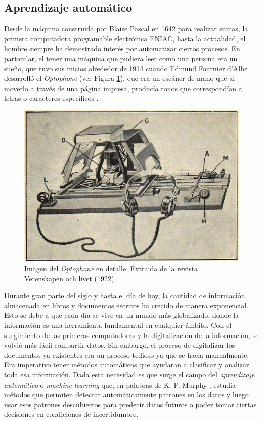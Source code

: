 \subsection{Aprendizaje automático}

	Desde la máquina construida por Blaise Pascal en 1642 para realizar sumas, la primera computadora programable electrónica ENIAC, hasta la actualidad, el hombre siempre ha demostrado interés por automatizar ciertos procesos. En particular, el tener una máquina que pudiera leer como una persona era un sueño, que tuvo sus inicios alrededor de 1914 cuando Edmund Fournier d'Albe desarrolló el \textit{Optophone} (ver Figura \ref{fig: Optophone}), que era un escáner de mano que al moverlo a través de una página impresa, producía tonos que correspondían	a letras o caracteres específicos \cite{EFdAlbe}.

			\begin{figure}[htbp]
				\centering
				\centerline{
					\includegraphics[scale=1]{img/Optophone.jpg}
				}
				\caption[Optophone]{Imagen del \textit{Optophone} en detalle. Extraida de la revista Vetenskapen och livet (1922).}
				\label{fig: Optophone}
			\end{figure}
			
	Durante gran parte del siglo  y hasta el día de hoy, la cantidad de información almacenada en libros y documentos escritos ha crecido de manera exponencial. Esto se debe a que cada día se vive en un mundo más glo\-ba\-li\-za\-do, donde la información es una herramienta fundamental en cualquier ámbito. Con el surgimiento de las primeras computadoras y la digitalización de la información, se volvió más fácil compartir datos. Sin embargo, el proceso de digitalizar los documentos ya existentes era un proceso tedioso ya que se hacía manualmente. Era imperativo tener métodos automáticos que ayudaran a clasificar y analizar toda esa información. Dada esta necesidad es que surge el campo del \textit{aprendizaje automático} o \textit{machine learning} que, en palabras de K. P. Murphy \cite{Murphy12}, estudia métodos que permiten detectar automáticamente patrones en los datos y luego usar esos patrones descubiertos para predecir datos futuros o poder tomar ciertas decisiones en condiciones de incertidumbre. 
	
